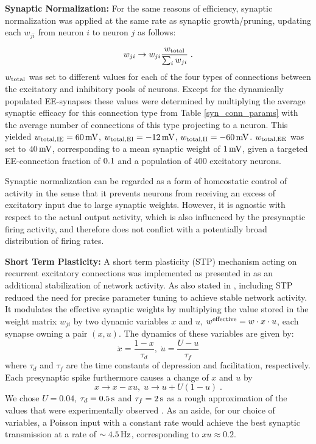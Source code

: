 \documentclass[10pt,letterpaper]{article}
\begin{document}
\textbf{Synaptic Normalization:} For the same reasons of efficiency, synaptic normalization was applied at the same rate as synaptic growth/pruning, updating each $w_{ji}$ from neuron $i$ to neuron $j$ as follows:

\begin{equation}
w_{ji} \rightarrow w_{ji} \frac{w_{\rm total}}{\sum_i w_{ji}} \; .
\label{Synnnorm}
\end{equation}
$w_{\rm total}$ was set to different values for each of the four types of connections between the excitatory and inhibitory pools of neurons. Except for the dynamically populated EE-synapses these values were determined by multiplying the average synaptic efficacy for this connection type from Table \ref{syn_conn_params} with the average number of connections of this type projecting to a neuron. This yielded $w_{\rm total,IE} = \rm 60\, mV$, $w_{\rm total,EI} =\rm -12\, mV$, $w_{\rm total,II} = \rm -60\, mV$. $w_{\rm total,EE}$ was set to $\rm 40\, mV$,  corresponding to a mean synaptic weight of $\rm 1\, mV$, given a targeted EE-connection fraction of $\rm 0.1$ and a population of $400$ excitatory neurons.

Synaptic normalization can be regarded as a form of homeostatic control of activity in the sense that it prevents neurons from receiving an excess of excitatory input due to large synaptic weights. However, it is agnostic with respect to the actual output activity, which is also influenced by the presynaptic firing activity, and therefore does not conflict with a potentially broad distribution of firing rates.

\textbf{Short Term Plasticity:} A short term plasticity (STP) mechanism acting on recurrent excitatory connections was implemented as presented in \cite{Markram_STP} as an additional stabilization of network activity. As also stated in \cite{SORN_Paper}, including STP reduced the need for precise parameter tuning to achieve stable network activity. It modulates the effective synaptic weights by multiplying the value stored in the weight matrix $w_{ji}$ by two dynamic variables $x$ and $u$, $w^{\rm effective} = w\cdot x \cdot u$, each synapse owning a pair $(x,u)$. The dynamics of these variables are given by:
\begin{equation}
\dot{x} = \frac{1-x}{\tau_d},\; \dot{u} = \frac{U-u}{\tau_f}
\label{STP_dynamics1}
\end{equation}
where $\tau_d$ and $\tau_f$ are the time constants of depression and facilitation, respectively.
Each presynaptic spike furthermore causes a change of $x$ and $u$ by
\begin{equation}
x \rightarrow x - x u,\; u \rightarrow u + U(1-u) \; .
\label{STP_dynamics2}
\end{equation}
We chose $U=0.04$, $\tau_d =\rm 0.5\, s$ and $\tau_f =\rm 2\, s$ as a rough approximation of the values that were experimentally observed \cite{Markram_STP}. As an aside, for our choice of variables, a Poisson input with a constant rate would achieve the best synaptic transmission at a rate of $\sim \rm 4.5\, Hz$, corresponding to $x u \approx 0.2$.   
\end{document}
